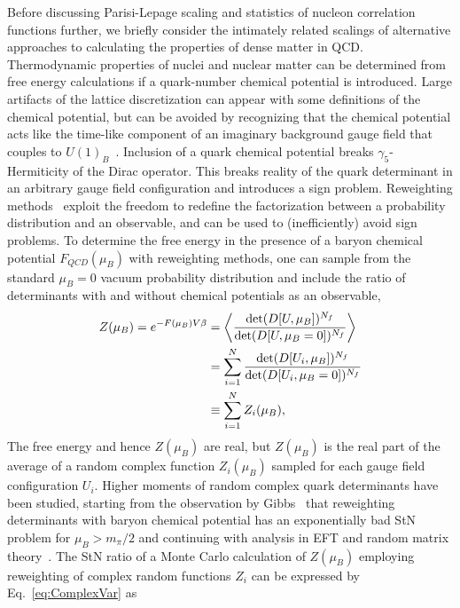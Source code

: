 Before discussing Parisi-Lepage scaling and statistics of nucleon correlation functions further, we briefly consider the intimately related scalings of alternative approaches to calculating the properties of dense matter in QCD.
Thermodynamic properties of nuclei and nuclear matter can be determined from free energy calculations if a quark-number chemical potential is introduced.
Large artifacts of the lattice discretization can appear with some definitions of the chemical potential, but can be avoided by recognizing that the chemical potential acts like the time-like component of an imaginary background gauge field that couples to $U(1)_B$~\cite{Hasenfratz:1983ba}.
Inclusion of a quark chemical potential breaks $\gamma_5$-Hermiticity of the Dirac operator.
This breaks reality of the quark determinant in an arbitrary gauge field configuration and introduces a sign problem.
Reweighting methods~\cite{Ferrenberg:1988yz} exploit the freedom to redefine the factorization between a probability distribution and an observable,
and can be used to (inefficiently) avoid sign problems.
To determine the free energy in the presence of a baryon chemical potential $F_{QCD}(\mu_B)$ with reweighting methods, one can sample from the standard $\mu_B=0$ vacuum probability distribution
and include the ratio of determinants with and without chemical potentials as an observable,
\begin{equation}
  \begin{split}
    Z(\mu_B) = e^{-F(\mu_B)V\beta} &= \left< \frac{\det(D[U,\mu_B])^{N_f}}{\det(D[U,\mu_B=0])^{N_f}} \right> \\
    &= \sum_{i=1}^N \frac{\det(D[U_i,\mu_B])^{N_f}}{\det(D[U_i,\mu_B=0])^{N_f}}\\
    &\equiv \sum_{i=1}^N Z_i(\mu_B),
  \end{split}\label{eq:ZmuBdef}
\end{equation}
The free energy and hence $Z(\mu_B)$ are real, but $Z(\mu_B)$ is the real part of the average of a random complex function $Z_i(\mu_B)$ sampled for each gauge field configuration $U_i$.
Higher moments of random complex quark determinants have been studied, starting from the observation by Gibbs~\cite{Gibbs:1986ut} that reweighting determinants with baryon chemical potential has an exponentially bad StN problem for $\mu_B > m_\pi / 2$ and continuing with analysis in EFT and random matrix theory~\cite{Cohen:2003kd,Cohen:2003ut,Splittorff:2006fu,Splittorff:2006vj,Splittorff:2007ck,deForcrand:2010ys,Alexandru:2014hga}.
The StN ratio of a Monte Carlo calculation of $Z(\mu_B)$ employing reweighting of complex random functions $Z_i$ can be expressed by Eq.~\eqref{eq:ComplexVar} as~\cite{Alexandru:2014hga}
